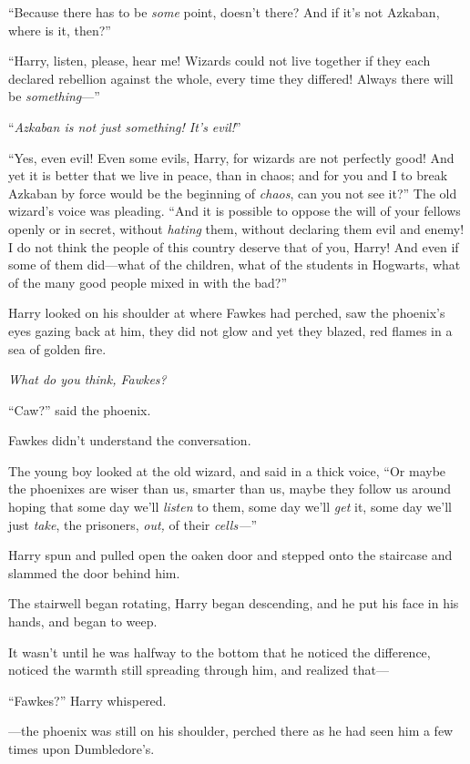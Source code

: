 “Because there has to be \emph{some} point, doesn’t there? And if it’s not Azkaban, where is it, then?”

“Harry, listen, please, hear me! Wizards could not live together if they each declared rebellion against the whole, every time they differed! Always there will be \emph{something}—”

“\emph{Azkaban is not just something! It’s evil!}”

“Yes, even evil! Even some evils, Harry, for wizards are not perfectly good! And yet it is better that we live in peace, than in chaos; and for you and I to break Azkaban by force would be the beginning of \emph{chaos}, can you not see it?” The old wizard’s voice was pleading. “And it is possible to oppose the will of your fellows openly or in secret, without \emph{hating} them, without declaring them evil and enemy! I do not think the people of this country deserve that of you, Harry! And even if some of them did—what of the children, what of the students in Hogwarts, what of the many good people mixed in with the bad?”

Harry looked on his shoulder at where Fawkes had perched, saw the phoenix’s eyes gazing back at him, they did not glow and yet they blazed, red flames in a sea of golden fire.

\emph{What do you think, Fawkes?}

“Caw?” said the phoenix.

Fawkes didn’t understand the conversation.

The young boy looked at the old wizard, and said in a thick voice, “Or maybe the phoenixes are wiser than us, smarter than us, maybe they follow us around hoping that some day we’ll \emph{listen} to them, some day we’ll \emph{get} it, some day we’ll just \emph{take}, the prisoners, \emph{out,} of their \emph{cells—}”

Harry spun and pulled open the oaken door and stepped onto the staircase and slammed the door behind him.

The stairwell began rotating, Harry began descending, and he put his face in his hands, and began to weep.

It wasn’t until he was halfway to the bottom that he noticed the difference, noticed the warmth still spreading through him, and realized that—

“Fawkes?” Harry whispered.

—the phoenix was still on his shoulder, perched there as he had seen him a few times upon Dumbledore’s.

